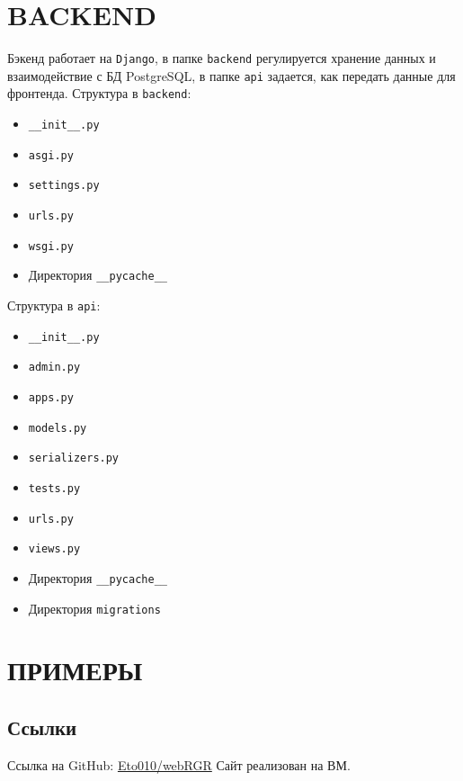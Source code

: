 \documentclass[a4paper,14pt,oneside,openany]{memoir}
\begin{document}
\chapter{BACKEND}
Бэкенд работает на \texttt{Django}, в папке \texttt{backend} регулируется хранение данных и взаимодействие с БД PostgreSQL, в папке \texttt{api} задается, как передать данные для фронтенда.
Структура в \texttt{backend}:
\begin{itemize}
    \item \texttt{\_\_init\_\_.py}
    \item \texttt{asgi.py}
    \item \texttt{settings.py}
    \item \texttt{urls.py}
    \item \texttt{wsgi.py}
    \item Директория \texttt{\_\_pycache\_\_}
\end{itemize}
Структура в \texttt{api}:
\begin{itemize}
    \item \texttt{\_\_init\_\_.py}
    \item \texttt{admin.py}
    \item \texttt{apps.py}
    \item \texttt{models.py}
    \item \texttt{serializers.py} 
    \item \texttt{tests.py}
    \item \texttt{urls.py}
    \item \texttt{views.py}
    \item Директория \texttt{\_\_pycache\_\_}
    \item Директория \texttt{migrations}
\end{itemize}

\chapter{ПРИМЕРЫ}
\section{Ссылки}
Ссылка на GitHub:
\href{https://github.com/Eto010/webRGR}{Eto010/webRGR}
Сайт реализован на ВМ.
\end{document}
